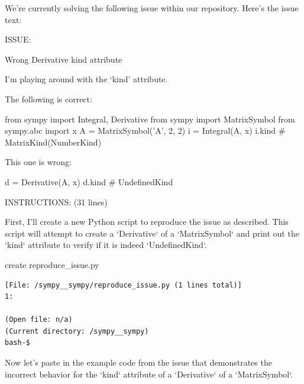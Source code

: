 {
\captionsetup{type=figure}
\begin{issuebox}We're currently solving the following issue within our repository. Here's the issue text:

ISSUE:

Wrong Derivative kind attribute

I'm playing around with the `kind' attribute.

The following is correct:

\begin{CodeVerbatim}[breaklines=true, breakanywhere=true]
from sympy import Integral, Derivative
from sympy import MatrixSymbol
from sympy.abc import x
A = MatrixSymbol('A', 2, 2)
i = Integral(A, x)
i.kind
# MatrixKind(NumberKind)
\end{CodeVerbatim}
This one is wrong:

\begin{CodeVerbatim}[breaklines=true, breakanywhere=true]
d = Derivative(A, x)
d.kind
# UndefinedKind
\end{CodeVerbatim}
INSTRUCTIONS: (31 lines)

\end{issuebox}
\begin{agentbox}
First, I'll create a new Python script to reproduce the issue as described. This script will attempt to create a `Derivative` of a `MatrixSymbol` and print out the `kind` attribute to verify if it is indeed `UndefinedKind`.

\hrulefill
\begin{CodeVerbatim}[breaklines=true, breakanywhere=true]
create reproduce_issue.py
\end{CodeVerbatim}
\end{agentbox}
\begin{observationbox}\begin{Verbatim}[breaklines=true, breakanywhere=true]
[File: /sympy__sympy/reproduce_issue.py (1 lines total)]
1:

(Open file: n/a)
(Current directory: /sympy__sympy)
bash-$
\end{Verbatim}
\end{observationbox}
\begin{agentbox}
Now let's paste in the example code from the issue that demonstrates the incorrect behavior for the `kind` attribute of a `Derivative` of a `MatrixSymbol`.




\end{agentbox}}
